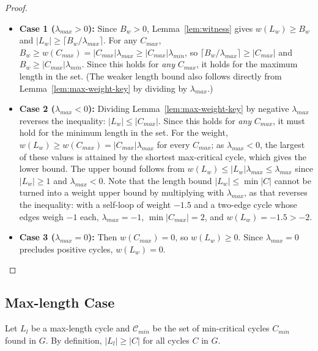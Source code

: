 \documentclass{article}
\theoremstyle{definition}
\begin{document}
\begin{proof}
\mbox{}\par
\begin{itemize}
    \item \textbf{Case 1 ($\lambda_{max} > 0$):} Since $B_w > 0$,
      Lemma~\ref{lem:witness} gives $w(L_w) \geq B_w$ and $|L_w| \geq
      \lceil B_w/\lambda_{max} \rceil$. For any $C_{max}$, $B_w \geq
      w(C_{max}) = |C_{max}|\lambda_{max} \geq |C_{max}|\lambda_{min}$,
      so $\lceil B_w/\lambda_{max} \rceil \geq |C_{max}|$ and $B_w \geq
      |C_{max}|\lambda_{min}$. Since this holds for \textit{any}
      $C_{max}$, it holds for the maximum length in the set. (The
      weaker length bound also follows directly from
      Lemma~\ref{lem:max-weight-key} by dividing by $\lambda_{max}$.)
    \item \textbf{Case 2 ($\lambda_{max} < 0$):} Dividing
      Lemma~\ref{lem:max-weight-key} by negative $\lambda_{max}$
      reverses the inequality: $|L_w| \leq |C_{max}|$. Since this
      holds for \textit{any} $C_{max}$, it must hold for the minimum
      length in the set. For the weight, $w(L_w) \geq w(C_{max}) =
      |C_{max}|\lambda_{max}$ for every $C_{max}$; as $\lambda_{max} <
      0$, the largest of these values is attained by the shortest
      max-critical cycle, which gives the lower bound. The upper bound
      follows from $w(L_w) \leq |L_w|\lambda_{max} \leq \lambda_{max}$
      since $|L_w| \geq 1$ and $\lambda_{max} < 0$. Note that the
      length bound $|L_w| \leq \min |C|$ cannot be turned into a
      weight upper bound by multiplying with $\lambda_{max}$, as that
      reverses the inequality: with a self-loop of weight $-1.5$ and a
      two-edge cycle whose edges weigh $-1$ each, $\lambda_{max} =
      -1$, $\min |C_{max}| = 2$, and $w(L_w) = -1.5 > -2$.
    \item \textbf{Case 3 ($\lambda_{max} = 0$):} Then $w(C_{max})=0$,
      so $w(L_w) \ge 0$. Since $\lambda_{max}=0$ precludes positive
      cycles, $w(L_w)=0$.
\end{itemize}
\end{proof}

\subsection{Max-length Case}
\label{sec:max-length-case}

Let $L_l$ be a max-length cycle and $\mathcal{C}_{min}$ be the set of
min-critical cycles $C_{min}$ found in $G$. By definition, $|L_l| \geq
|C|$ for all cycles $C$ in $G$.
\end{document}
